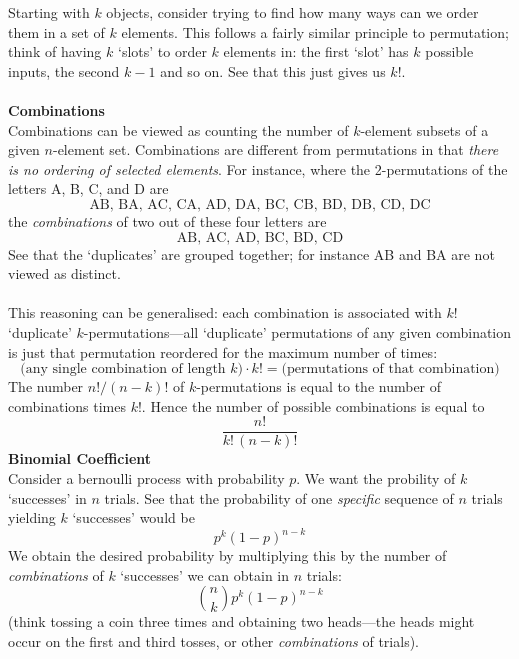 \documentclass{report}
\begin{document}
Starting with $k$ objects, consider trying to find how many ways can we order them in a set of $k$ elements. 
This follows a fairly similar principle to permutation; think of having $k$ `slots' to order $k$ elements in: 
the first `slot' has $k$ possible inputs, the second $k-1$ and so on. See that this just gives us $k!$.\\
\vspace{1mm}\\
\textbf{Combinations}\\
Combinations can be viewed as counting the number of $k$-element subsets of a given $n$-element set.
Combinations are different from permutations in that
\textit{there is no ordering of selected elements}. For instance, where the 2-permutations of the letters 
A, B, C, and D are
\begin{equation*}
\text{AB, BA, AC, CA, AD, DA, BC, CB, BD, DB, CD, DC}
\end{equation*}
the \textit{combinations} of two out of these four letters are
\begin{equation*}
\text{AB, AC, AD, BC, BD, CD}
\end{equation*}
See that the `duplicates' are grouped together; for instance AB and BA are not viewed as distinct.\\
\vspace{1mm}\\
This reasoning can be generalised: each combination is associated with $k!$ `duplicate' $k$-permutations---all
`duplicate' permutations of any given combination is just
that permutation reordered for the maximum number of times:
\begin{equation*}
\text{(any single combination of length $k$)}\cdot k!=\text{(permutations of that combination)}
\end{equation*}
The number $n!/(n-k)!$ of $k$-permutations is equal to the number of combinations times $k!$. Hence the number of
possible combinations is equal to
\begin{equation*}
\frac{n!}{k!\,(n-k)!}
\end{equation*}
\textbf{Binomial Coefficient}\\
Consider a bernoulli process with probability $p$. We want the probility of $k$ `successes' in $n$ trials. 
See that the probability of one \textit{specific} sequence of $n$ trials yielding $k$ `successes' would be
\begin{equation*}
p^k(1-p)^{n-k}
\end{equation*}
We obtain the desired probability by multiplying this by the number of \textit{combinations} of $k$ `successes' we
can obtain in $n$ trials: 
\begin{equation*}
\binom{n}{k}p^k(1-p)^{n-k}
\end{equation*}
(think tossing a coin three times and obtaining two heads---the heads might occur on 
the first and third tosses, or other \textit{combinations} of trials).
\newpage
\end{document}
